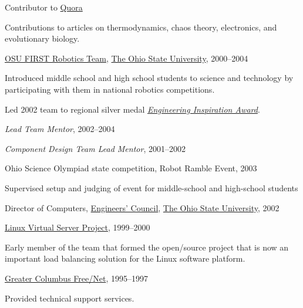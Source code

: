 \documentclass[10pt]{article}
\newcommand{\halfblankline}{\quad\vspace{-0.5\baselineskip}\pagebreak[3]}
\begin{document}
\halfblankline

Contributor to \href{http://www.quora.com/}{Quora}
%
\begin{innerlist}
    \item Contributions to articles on thermodynamics, chaos theory,
        electronics, and evolutionary biology.
\end{innerlist}

\halfblankline

\href{http://www.osufirst.org/}{OSU FIRST Robotics Team},
\href{http://www.osu.edu}{The Ohio State University}, 2000--2004
\begin{innerlist}
\item Introduced middle school and high school students to science and
        technology by participating with them in national robotics
        competitions.
\item Led 2002 team to regional silver medal
        \href{http://www.firstwiki.org/Engineering_Inspiration_Award}
             {\emph{Engineering Inspiration Award}}.
\item \emph{Lead Team Mentor}, 2002--2004
\item \emph{Component Design Team Lead Mentor}, 2001--2002
\end{innerlist}

\halfblankline

Ohio Science Olympiad state competition, Robot Ramble Event, 2003
%
\begin{innerlist}
    \item Supervised setup and judging of event for middle-school and
        high-school students
\end{innerlist}

\halfblankline

Director of Computers,
\href{http://ec.osu.edu/}{Engineers' Council},
\href{http://www.osu.edu/}{The Ohio State University}, 2002

\halfblankline

\href{http://www.linuxvirtualserver.org/}
     {Linux Virtual Server Project}, 1999--2000
\begin{innerlist}
\item Early member of the team that formed the open\-/source project that
        is now an important load balancing solution for the Linux
        software platform.
\end{innerlist}

\halfblankline

\href{http://www.gcfn.org/}
     {Greater Columbus Free\-/Net}, 1995--1997
\begin{innerlist}
\item Provided technical support services.
\end{innerlist}
\end{document}
